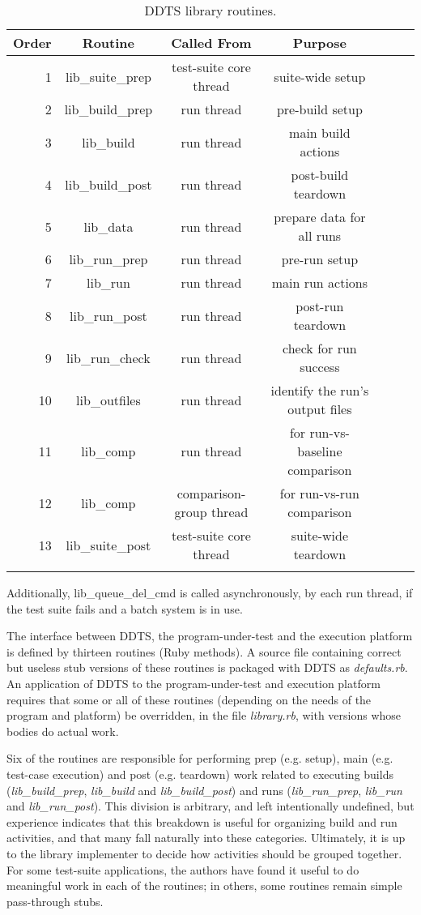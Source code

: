 \documentclass[conference]{IEEEtran}
\begin{document}
\begin{table}[!t]
\centering
\begin{tabular}{r c c c c c c}
\hline
Order & Routine & Called From & Purpose \\ 
\hline
1 & lib\_suite\_prep & test-suite core thread & suite-wide setup \\
2 & lib\_build\_prep & run thread & pre-build setup \\
3 & lib\_build & run thread & main build actions \\
4 & lib\_build\_post & run thread & post-build teardown \\
5 & lib\_data & run thread & prepare data for all runs \\
6 & lib\_run\_prep & run thread & pre-run setup \\
7 & lib\_run & run thread & main run actions \\
8 & lib\_run\_post & run thread & post-run teardown \\
9 & lib\_run\_check & run thread & check for run success \\
10 & lib\_outfiles & run thread & identify the run's output files \\
11 & lib\_comp & run thread & for run-vs-baseline comparison \\
12 & lib\_comp & comparison-group thread & for run-vs-run comparison \\
13 & lib\_suite\_post & test-suite core thread & suite-wide teardown \\
\hline
\newline
\end{tabular}
Additionally, lib\_queue\_del\_cmd is called asynchronously, by each run thread, if the test suite fails and a batch system is in use.
\newline
\caption{DDTS library routines. }
\label{table:routines}
\end{table}

The interface between DDTS, the program-under-test and the execution platform is defined by thirteen routines (Ruby methods). A source file containing correct but useless stub versions of these routines is packaged with DDTS as \emph{defaults.rb}. An application of DDTS to the program-under-test and execution platform requires that some or all of these routines (depending on the needs of the program and platform) be overridden, in the file \emph{library.rb}, with versions whose bodies do actual work.

Six of the routines are responsible for performing prep (e.g. setup), main (e.g. test-case execution) and post (e.g. teardown) work related to executing builds (\emph{lib\_build\_prep}, \emph{lib\_build} and \emph{lib\_build\_post}) and runs (\emph{lib\_run\_prep}, \emph{lib\_run} and \emph{lib\_run\_post}). This division is arbitrary, and left intentionally undefined, but experience indicates that this breakdown is useful for organizing build and run activities, and that many fall naturally into these categories. Ultimately, it is up to the library implementer to decide how activities should be grouped together. For some test-suite applications, the authors have found it useful to do meaningful work in each of the routines; in others, some routines remain simple pass-through stubs.
\end{document}
